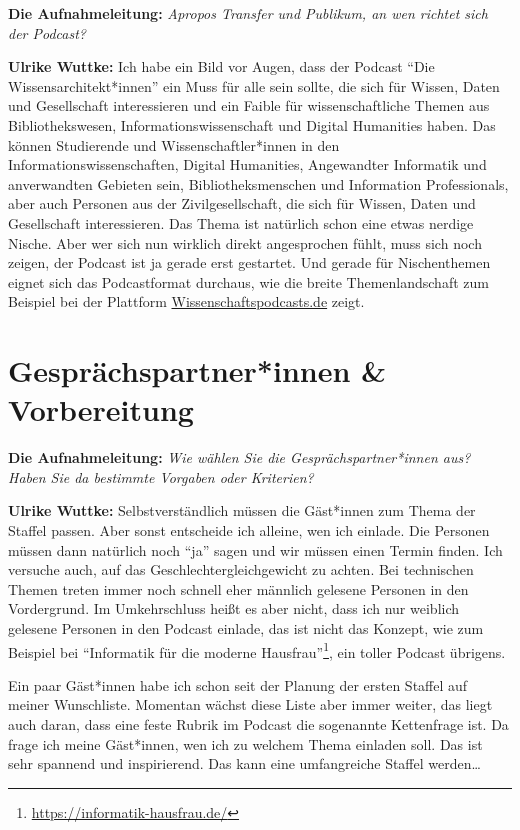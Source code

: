 \documentclass[a4paper,
fontsize=11pt,
oneside,
numbers=noperiodatend,
parskip=half-,
bibliography=totoc,
final
]{scrartcl}
\begin{document}
\textbf{Die Aufnahmeleitung:} \emph{Apropos Transfer und Publikum, an
wen richtet sich der Podcast?}

\textbf{Ulrike Wuttke:} Ich habe ein Bild vor Augen, dass der Podcast
\enquote{Die Wissensarchitekt*innen} ein Muss für alle sein sollte, die
sich für Wissen, Daten und Gesellschaft interessieren und ein Faible für
wissenschaftliche Themen aus Bibliothekswesen, Informationswissenschaft
und Digital Humanities haben. Das können Studierende und
Wissenschaftler*innen in den Informationswissenschaften, Digital
Humanities, Angewandter Informatik und anverwandten Gebieten sein,
Bibliotheksmenschen und Information Professionals, aber auch Personen
aus der Zivilgesellschaft, die sich für Wissen, Daten und Gesellschaft
interessieren. Das Thema ist natürlich schon eine etwas nerdige Nische.
Aber wer sich nun wirklich direkt angesprochen fühlt, muss sich noch
zeigen, der Podcast ist ja gerade erst gestartet. Und gerade für
Nischenthemen eignet sich das Podcastformat durchaus, wie die breite
Themenlandschaft zum Beispiel bei der Plattform
\href{https://wissenschaftspodcasts.de}{Wissenschaftspodcasts.de} zeigt.

\section{Gesprächspartner*innen \&
Vorbereitung}\label{gespruxe4chspartnerinnen-vorbereitung}

\textbf{Die Aufnahmeleitung:} \emph{Wie wählen Sie die
Gesprächspartner*innen aus? Haben Sie da bestimmte Vorgaben oder
Kriterien?}

\textbf{Ulrike Wuttke:} Selbstverständlich müssen die Gäst*innen zum
Thema der Staffel passen. Aber sonst entscheide ich alleine, wen ich
einlade. Die Personen müssen dann natürlich noch \enquote{ja} sagen und
wir müssen einen Termin finden. Ich versuche auch, auf das
Geschlechtergleichgewicht zu achten. Bei technischen Themen treten immer
noch schnell eher männlich gelesene Personen in den Vordergrund. Im
Umkehrschluss heißt es aber nicht, dass ich nur weiblich gelesene
Personen in den Podcast einlade, das ist nicht das Konzept, wie zum
Beispiel bei \enquote{Informatik für die moderne Hausfrau}\footnote{\url{https://informatik-hausfrau.de/}},
ein toller Podcast übrigens.

Ein paar Gäst*innen habe ich schon seit der Planung der ersten Staffel
auf meiner Wunschliste. Momentan wächst diese Liste aber immer weiter,
das liegt auch daran, dass eine feste Rubrik im Podcast die sogenannte
Kettenfrage ist. Da frage ich meine Gäst*innen, wen ich zu welchem Thema
einladen soll. Das ist sehr spannend und inspirierend. Das kann eine
umfangreiche Staffel werden\ldots{}
\end{document}
